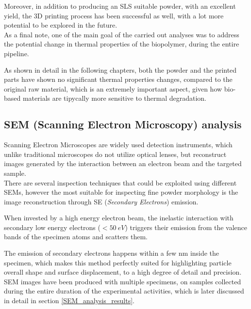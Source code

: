 \documentclass{article}
\begin{document}
    Moreover, in addition to producing an SLS suitable powder, with an excellent yield, the 3D printing process has been successful as well, with 
    a lot more potential to be explored in the future. \\ 

    As a final note, one of the main goal of the carried out analyses was to address the potential change in thermal properties of the biopolymer, during the entire pipeline. 
    
    As shown in detail in the following chapters, both the powder and the printed parts have shown no significant thermal properties changes, compared to the 
    original raw material, which is an extremely important aspect, given how bio-based materials are tipycally more sensitive to thermal degradation. \\ 


    \clearpage
        \subsection{SEM (Scanning Electron Microscopy) analysis\label{SEM_analysis}}

        Scanning Electron Microscopes are widely used detection instruments, which unlike traditional microscopes 
        do not utilize optical lenses, but reconstruct images generated by the interaction between an electron beam and the targeted 
        sample. \\ 

        There are several inspection techniques that could be exploited using different SEMs, however the most suitable for inspecting 
        fine powder morphology is the image reconstruction through SE (\textit{Secondary Electrons}) emission. 

        When invested by a high energy electron beam, the inelastic interaction with secondary low energy electrons ($< 50 \ eV$) triggers their emission from the valence bands of the specimen atoms and scatters them. 

        The emission of secondary electrons happens within a few nm inside the specimen, which makes this method perfectly suited 
        for highlighting particle overall shape and surface displacement, to a high degree of detail and precision. \\

        SEM images have been produced with multiple specimens, on samples collected during the entire duration of the experimental 
        activities, which is later discussed in detail in section \ref{SEM_analysis_results}. 
\end{document}
